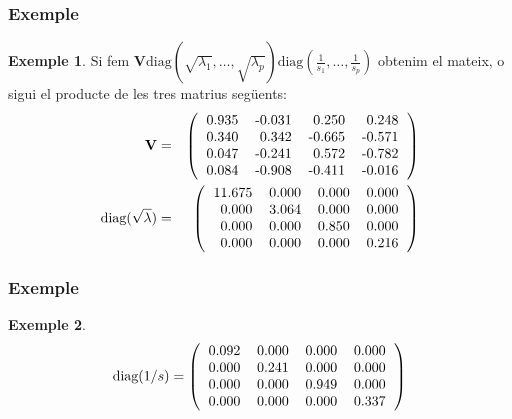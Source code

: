 \documentclass[12pt,t]{beamer}
\theoremstyle{plain}
\theoremstyle{definition}
\newtheorem{exemple}{Exemple}
\begin{document}
\begin{frame}
\frametitle{Exemple}
\begin{exemple}
Si fem 
$\mathbf{V}\mbox{diag}(\sqrt{\lambda_1},\ldots,\sqrt{\lambda_p})\mbox{diag}\left(\frac{1}{s_1},\ldots,\frac{1}{s_p}
\right)$ obtenim el mateix, o sigui el producte de les tres matrius següents:
\begin{eqnarray*}
\mathbf{V} &=&\left(
\begin{tabular}{rrrr}
  0.935 & -0.031 & 0.250 & 0.248 \\ 
  0.340 & 0.342 & -0.665 & -0.571 \\ 
  0.047 & -0.241 & 0.572 & -0.782 \\ 
  0.084 & -0.908 & -0.411 & -0.016 \\ 
  \end{tabular}\right)\\
\mbox{diag}(\sqrt{\lambda}) &=&\left(
\begin{tabular}{rrrr}
  11.675 & 0.000 & 0.000 & 0.000 \\ 
  0.000 & 3.064 & 0.000 & 0.000 \\ 
  0.000 & 0.000 & 0.850 & 0.000 \\ 
  0.000 & 0.000 & 0.000 & 0.216 \\ 
  \end{tabular}\right)
\end{eqnarray*}


\end{exemple}
\end{frame}

\begin{frame}
\frametitle{Exemple}
\begin{exemple}
\[
\mbox{diag}(1/s)=\left(
\begin{tabular}{rrrr}
  0.092 & 0.000 & 0.000 & 0.000 \\ 
  0.000 & 0.241 & 0.000 & 0.000 \\ 
  0.000 & 0.000 & 0.949 & 0.000 \\ 
  0.000 & 0.000 & 0.000 & 0.337 \\ 
  \end{tabular}\right)
\]

\end{exemple}
\end{frame}
\end{document}
